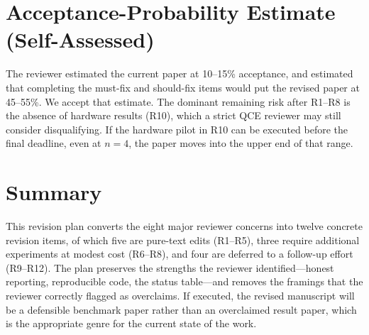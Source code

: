 \documentclass[conference,10pt]{IEEEtran}
\begin{document}
\section{Acceptance-Probability Estimate (Self-Assessed)}

The reviewer estimated the current paper at 10--15\% acceptance, and
estimated that completing the must-fix and should-fix items would put
the revised paper at 45--55\%. We accept that estimate. The dominant
remaining risk after R1--R8 is the absence of hardware results (R10),
which a strict QCE reviewer may still consider disqualifying. If the
hardware pilot in R10 can be executed before the final deadline, even
at $n = 4$, the paper moves into the upper end of that range.

\section{Summary}

This revision plan converts the eight major reviewer concerns into
twelve concrete revision items, of which five are pure-text edits
(R1--R5), three require additional experiments at modest cost (R6--R8),
and four are deferred to a follow-up effort (R9--R12). The plan
preserves the strengths the reviewer identified---honest reporting,
reproducible code, the status table---and removes the framings that
the reviewer correctly flagged as overclaims. If executed, the revised
manuscript will be a defensible benchmark paper rather than an
overclaimed result paper, which is the appropriate genre for the
current state of the work.
\end{document}

